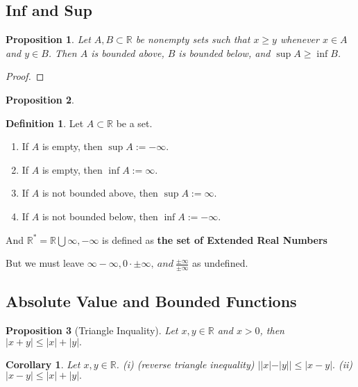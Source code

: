 \documentclass{article}
\newtheorem{corollary}{Corollary}[theorem]
\newtheorem{proposition}{Proposition}[section]
\theoremstyle{definition}
\newtheorem{defi}{Definition}[section]
\begin{document}
\subsection{Inf and Sup}

\begin{proposition}
Let $A,B\subset \mathbb{R}$ be nonempty sets such that $x\geq y$ whenever $x\in A$ and $y\in B$. Then $A$ is bounded above, $B$ is bounded below, and $\sup A\geq \inf B$. 
\end{proposition}

\begin{proof}




\end{proof}

\begin{proposition}
\end{proposition}

\begin{defi}Let $A\subset \mathbb{R}$ be a set.
\begin{enumerate}
\item If $A$ is empty, then $\sup A:=-\infty.$
\item If $A$ is empty, then $\inf A:=\infty.$
\item If $A$ is not bounded above, then $\sup A:=\infty.$
\item If $A$ is not bounded below, then $\inf A:=-\infty.$ 
\end{enumerate}

And $\mathbb{R}^{*}=\mathbb{R}\bigcup {\infty,-\infty}$ is defined as \textbf{the set of Extended Real Numbers}
\end{defi}

But we must leave $\infty-\infty,0\cdot\pm\infty,\ and\ \frac{\pm \infty}{\pm \infty}$ as undefined.


\subsection{Absolute Value and Bounded Functions}
\begin{proposition}[Triangle Inquality]
    Let $x,y\in \mathbb{R}$ and $x>0$, then $|x+y|\leq |x|+|y|.$
\end{proposition}

\begin{corollary}
    Let $x,y\in \mathbb{R}$.
    (i) (reverse triangle inequality) $||x|-|y||\leq |x-y|.$
    (ii) $|x-y|\leq |x|+|y|.$
\end{corollary}
\end{document}
